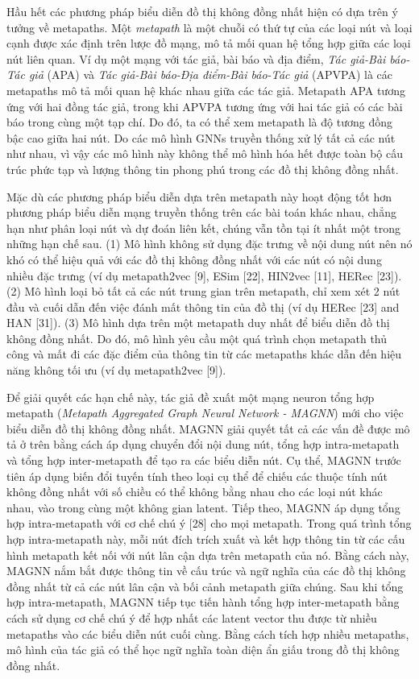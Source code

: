  Hầu hết các phương pháp biểu diễn đồ thị không đồng nhất hiện có dựa trên ý tưởng về metapaths. Một \textit{metapath} là một chuỗi có thứ tự của các loại nút và loại cạnh được xác định trên lược đồ mạng, mô tả mối quan hệ tổng hợp giữa các loại nút liên quan. Ví dụ một mạng với tác giả, bài báo và địa điểm, \textit{Tác giả-Bài báo-Tác giả} (APA) và \textit{Tác giả-Bài báo-Địa điểm-Bài báo-Tác giả} (APVPA) là các metapaths mô tả mối quan hệ khác nhau giữa các tác giả. Metapath APA tương ứng với hai đồng tác giả, trong khi APVPA tương ứng với hai tác giả có các bài báo trong cùng một tạp chí. Do đó, ta có thể xem metapath là độ tương đồng bậc cao giữa hai nút. Do các mô hình GNNs truyền thống xử lý tất cả các nút như nhau, vì vậy các mô hình này không thể mô hình hóa hết được toàn bộ cấu trúc phức tạp và lượng thông tin phong phú trong các đồ thị không đồng nhất.

 Mặc dù các phương pháp biểu diễn dựa trên metapath này hoạt động tốt hơn phương pháp biểu diễn mạng truyền thống trên các bài toán khác nhau, chẳng hạn như phân loại nút và dự đoán liên kết, chúng vẫn tồn tại ít nhất một trong những hạn chế sau. (1) Mô hình không sử dụng đặc trưng về nội dung nút nên nó khó có thể hiệu quả với các đồ thị không đồng nhất với các nút có nội dung nhiều đặc trưng (ví dụ metapath2vec [9], ESim [22], HIN2vec [11], HERec [23]). (2) Mô hình loại bỏ tất cả các nút trung gian trên metapath, chỉ xem xét 2 nút đầu và cuối dẫn đến việc đánh mất thông tin của đồ thị (ví dụ HERec [23] and HAN [31]). (3) Mô hình dựa trên một metapath duy nhất để biểu diễn đồ thị không đồng nhất. Do đó, mô hình yêu cầu một quá trình chọn metapath thủ công và mất đi các đặc điểm của thông tin từ các metapaths khác dẫn đến hiệu năng không tối ưu (ví dụ metapath2vec [9]). 

 Để giải quyết các hạn chế này, tác giả đề xuất một mạng neuron tổng hợp metapath (\textit{Metapath Aggregated Graph Neural Network - MAGNN}) mới cho việc biểu diễn đồ thị không đồng nhất. MAGNN giải quyết tất cả các vấn đề được mô tả ở trên bằng cách áp dụng chuyển đổi nội dung nút, tổng hợp intra-metapath và tổng hợp inter-metapath để tạo ra các biểu diễn nút. Cụ thể, MAGNN trước tiên áp dụng biến đổi tuyến tính theo loại cụ thể để chiếu các thuộc tính nút không đồng nhất với số chiều có thể không bằng nhau cho các loại nút khác nhau, vào trong cùng một không gian latent. Tiếp theo, MAGNN áp dụng tổng hợp intra-metapath với cơ chế chú ý [28] cho mọi metapath. Trong quá trình tổng hợp intra-metapath này, mỗi nút đích trích xuất và kết hợp thông tin từ các cấu hình metapath kết nối với nút lân cận dựa trên metapath của nó. Bằng cách này, MAGNN nắm bắt được thông tin về cấu trúc và ngữ nghĩa của các đồ thị không đồng nhất từ cả các nút lân cận và bối cảnh metapath giữa chúng. Sau khi tổng hợp intra-metapath, MAGNN tiếp tục tiến hành tổng hợp inter-metapath bằng cách sử dụng cơ chế chú ý để hợp nhất các latent vector thu được từ nhiều metapaths vào các biểu diễn nút cuối cùng. Bằng cách tích hợp nhiều metapaths, mô hình của tác giả có thể học ngữ nghĩa toàn diện ẩn giấu trong đồ thị không đồng nhất. 

